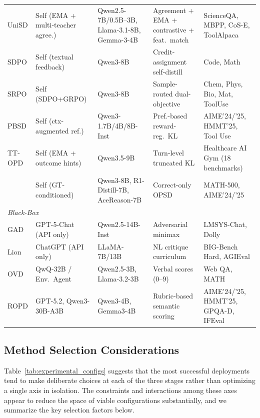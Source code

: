 \documentclass{article} %
\begin{document}
\begin{table}[t]
{\begin{tabular}{@{}lllll@{}}
        UniSD \citep{jin2026unisd} & Self (EMA + multi-teacher agree.) & Qwen2.5-7B/0.5B--3B, Llama-3.1-8B, Gemma-3-4B & Agreement + EMA + contrastive + feat.~match & ScienceQA, MBPP, CoS-E, ToolAlpaca \\
        SDPO \citep{2601.20802} & Self (textual feedback) & Qwen3-8B & Credit-assignment self-distill & Code, Math \\
        SRPO \citep{li2026unifying} & Self (SDPO+GRPO) & Qwen3-8B & Sample-routed dual-objective & Chem, Phys, Bio, Mat, ToolUse \\
        PBSD \citep{pbsd2026} & Self (ctx-augmented ref.) & Qwen3-1.7B/4B/8B-Inst & Pref.-based reward-reg.\ KL & AIME'24/'25, HMMT'25, Tool Use \\
        TT-OPD \citep{ttopd2026} & Self (EMA + outcome hints) & Qwen3.5-9B & Turn-level truncated KL & Healthcare AI Gym (18 benchmarks) \\
        \citet{kim2026opsdcompresses} & Self (GT-conditioned) & Qwen3-8B, R1-Distill-7B, AceReason-7B & Correct-only OPSD & MATH-500, AIME'24/'25 \\
        \midrule
        \multicolumn{5}{l}{\textit{Black-Box}} \\
        \midrule
        GAD \citep{2511.10643} & GPT-5-Chat (API only) & Qwen2.5-14B-Inst & Adversarial minimax & LMSYS-Chat, Dolly \\
        Lion \citep{2305.12870} & ChatGPT (API only) & LLaMA-7B/13B & NL critique curriculum & BIG-Bench Hard, AGIEval \\
        OVD \citep{2601.21968} & QwQ-32B / Env.~Agent & Qwen2.5-3B, Llama-3.2-3B & Verbal scores (0--9) & Web QA, MATH \\
        ROPD \citep{fang2026ropd} & GPT-5.2, Qwen3-30B-A3B & Qwen3-4B, Gemma3-4B & Rubric-based semantic scoring & AIME'24/'25, HMMT'25, GPQA-D, IFEval \\
        \bottomrule
    \end{tabular}
    }
\end{table}


\subsection{Method Selection Considerations}
\label{subsec:decision_tree}

Table~\ref{tab:experimental_configs} suggests that the most successful deployments tend to make deliberate choices at each of the three stages rather than optimizing a single axis in isolation. The constraints and interactions among these axes appear to reduce the space of viable configurations substantially, and we summarize the key selection factors below.
\end{document}
